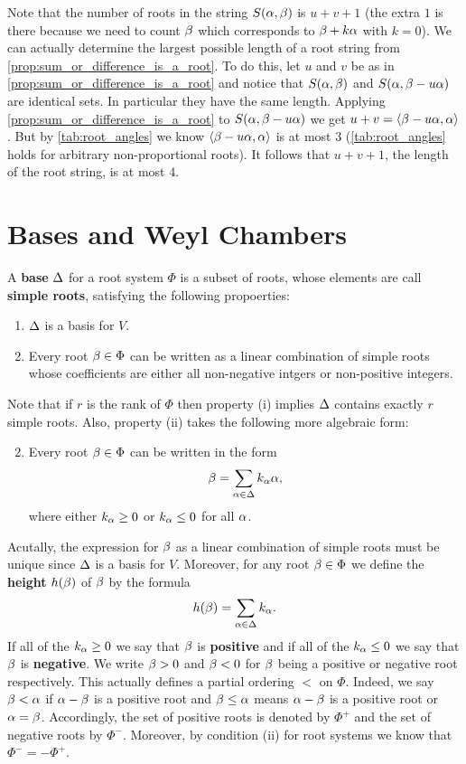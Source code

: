 \documentclass[12pt,reqno,oneside]{amsart}
\begin{document}
     Note that the number of roots in the string $S(\alpha,\beta)$ is $u+v+1$ (the extra $1$ is there because we need to count $\beta$ which corresponds to $\beta+k\alpha$ with $k = 0$). We can actually determine the largest possible length of a root string from \cref{prop:sum_or_difference_is_a_root}. To do this, let $u$ and $v$ be as in \cref{prop:sum_or_difference_is_a_root} and notice that $S(\alpha,\beta)$ and $S(\alpha,\beta-u\alpha)$ are identical sets. In particular they have the same length. Applying \cref{prop:sum_or_difference_is_a_root} to $S(\alpha,\beta-u\alpha)$ we get $u+v = \langle\beta-u\alpha,\alpha\rangle$. But by \cref{tab:root_angles} we know $\langle\beta-u\alpha,\alpha\rangle$ is at most $3$ (\cref{tab:root_angles} holds for arbitrary non-proportional roots). It follows that $u+v+1$, the length of the root string, is at most $4$.
\section{Bases and Weyl Chambers}
    A \textbf{base} $\Delta$ for a root system $\Phi$ is a subset of roots, whose elements are call \textbf{simple roots}, satisfying the following propoerties:

    \begin{enumerate}[label=(\roman*)]
        \item $\Delta$ is a basis for $V$.
        \item Every root $\beta \in \Phi$ can be written as a linear combination of simple roots whose coefficients are either all non-negative intgers or non-positive integers.
    \end{enumerate}

    Note that if $r$ is the rank of $\Phi$ then property (i) implies $\Delta$ contains exactly $r$ simple roots. Also, property (ii) takes the following more algebraic form:

    \begin{enumerate}[label=(\roman*)]
        \setcounter{enumi}{1}
        \item Every root $\beta \in \Phi$ can be written in the form
        \[
            \beta = \sum_{\alpha \in \Delta}k_{\alpha}\alpha,
        \]
        where either $k_{\alpha} \ge 0$ or $k_{\alpha} \le 0$ for all $\alpha$.
    \end{enumerate}

    Acutally, the expression for $\beta$ as a linear combination of simple roots must be unique since $\Delta$ is a basis for $V$. Moreover, for any root $\beta \in \Phi$ we define the \textbf{height} $h(\beta)$ of $\beta$ by the formula
    \[
        h(\beta) = \sum_{\alpha \in \Delta}k_{\alpha}.
    \]
    If all of the $k_{\alpha} \ge 0$ we say that $\beta$ is \textbf{positive} and if all of the $k_{\alpha} \le 0$ we say that $\beta$ is \textbf{negative}. We write $\beta > 0$ and $\beta < 0$ for $\beta$ being a positive or negative root respectively. This actually defines a partial ordering $<$ on $\Phi$. Indeed, we say $\beta < \alpha$ if $\alpha-\beta$ is a positive root and $\beta \le \alpha$ means $\alpha-\beta$ is a positive root or $\alpha = \beta$. Accordingly, the set of positive roots is denoted by $\Phi^{+}$ and the set of negative roots by $\Phi^{-}$. Moreover, by condition (ii) for root systems we know that $\Phi^{-} = -\Phi^{+}$.
\end{document}
